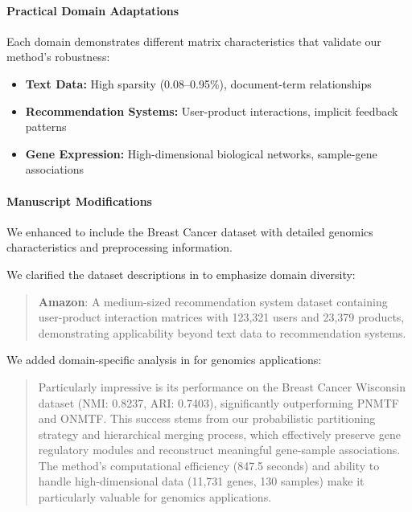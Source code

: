 \documentclass{ar2rc}
\begin{document}
\paragraph{Practical Domain Adaptations}

Each domain demonstrates different matrix characteristics that validate our method's robustness:
\begin{itemize}
  \item \textbf{Text Data:} High sparsity (0.08--0.95\%), document-term relationships
  \item \textbf{Recommendation Systems:} User-product interactions, implicit feedback patterns
  \item \textbf{Gene Expression:} High-dimensional biological networks, sample-gene associations
\end{itemize}

\paragraph{Manuscript Modifications}

We enhanced  to include the Breast Cancer dataset with detailed genomics characteristics and preprocessing information.

We clarified the dataset descriptions in  to emphasize domain diversity:

\begin{quote}
  \textbf{Amazon}: A medium-sized recommendation system dataset containing user-product interaction matrices with 123,321 users and 23,379 products, demonstrating applicability beyond text data to recommendation systems.
\end{quote}

We added domain-specific analysis in  for genomics applications:

\begin{quote}
  Particularly impressive is its performance on the Breast Cancer Wisconsin dataset (NMI: 0.8237, ARI: 0.7403), significantly outperforming PNMTF and ONMTF. This success stems from our probabilistic partitioning strategy and hierarchical merging process, which effectively preserve gene regulatory modules and reconstruct meaningful gene-sample associations. The method's computational efficiency (847.5 seconds) and ability to handle high-dimensional data (11,731 genes, 130 samples) make it particularly valuable for genomics applications.
\end{quote}
\end{document}
